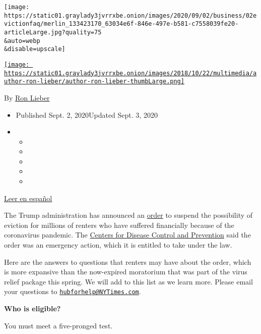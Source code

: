\texttt{[image: https://static01.graylady3jvrrxbe.onion/images/2020/09/02/business/02evictionfaq/merlin\_133423170\_63034e6f-846e-497e-b581-c7558039fe20-articleLarge.jpg?quality=75\\\&auto=webp\\\&disable=upscale]}

\href{https://www.nytimes3xbfgragh.onion/by/ron-lieber}{\texttt{[image: https://static01.graylady3jvrrxbe.onion/images/2018/10/22/multimedia/author-ron-lieber/author-ron-lieber-thumbLarge.png]}}

By \href{https://www.nytimes3xbfgragh.onion/by/ron-lieber}{Ron Lieber}

\begin{itemize}
\item
  Published Sept. 2, 2020Updated Sept. 3, 2020
\item
  \begin{itemize}
  \item
  \item
  \item
  \item
  \item
  \end{itemize}
\end{itemize}

\href{https://www.nytimes3xbfgragh.onion/es/2020/09/02/espanol/negocios/desalojos-trump.html}{Leer
en español}

The Trump administration has announced an
\href{https://s3.amazonaws.com/public-inspection.federalregister.gov/2020-19654.pdf}{order}
to suspend the possibility of eviction for millions of renters who have
suffered financially because of the coronavirus pandemic. The
\href{https://www.nytimes3xbfgragh.onion/2020/09/01/business/eviction-moratorium-order.html}{Centers
for Disease Control and Prevention} said the order was an emergency
action, which it is entitled to take under the law.

Here are the answers to questions that renters may have about the order,
which is more expansive than the now-expired moratorium that was part of
the virus relief package this spring. We will add to this list as we
learn more. Please email your questions to
\href{mailto:hubforhelp@NYTimes.com}{\nolinkurl{hubforhelp@NYTimes.com}}.

\textbf{Who is eligible?}

You must meet a five-pronged test.

